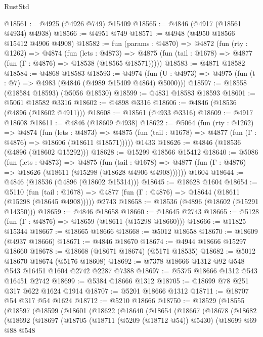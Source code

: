 \begin{lexlean}{RustStd}
\begin{coremodule}
@18561 := @4925 (@4926 @749) @15409
@18565 := @4846 (@4917 (@18561 @4934) @4938)
@18566 := @4951 @749
@18571 := @4948 (@4950 @18566 @15412 @4906 @4908)
@18582 := fun (params : @4870) =>
  @4872
    (fun (rty : @1262) =>
    @4874
      (fun (lets : @4873) =>
      @4875 (fun (tail : @1678) => @4877 (fun (Γ : @4876) => @18538 (@18565 @18571)))))
@18583 := @4871 @18582
@18584 := @4868 @18583
@18593 := @4974
    (fun (U : @4973) => @4975 (fun (t : @7) => @4983 (@4846 (@4989 @15409 @4864) @5000)))
@18597 := @18558 (@18584 @18593) (@5056 @18530)
@18599 := @4831 @18583 @18593
@18601 := @5061 @18582 @3316
@18602 := @4898 @3316
@18606 := @4846 (@18536 (@4896 (@18602 @4911)))
@18608 := @18561 (@4933 @3316)
@18609 := @4917 @18608
@18611 := @4846 (@18609 @4938)
@18622 := @5064
    (fun (rty : @1262) =>
    @4874
      (fun (lets : @4873) =>
      @4875 (fun (tail : @1678) => @4877 (fun (Γ : @4876) => @18606 (@18611 @18571)))))
    @1433
@18626 := @4846 (@18536 (@4896 (@18602 @15292)))
@18628 := @15299 @18566 @15412
@18640 := @5086
    (fun (lets : @4873) =>
    @4875
      (fun (tail : @1678) =>
      @4877 (fun (Γ : @4876) => @18626 (@18611 (@15298 (@18628 @4906 @4908))))))
    @1604
@18644 := @4846 (@18536 (@4896 (@18602 @15314)))
@18645 := @18628 @1604
@18654 := @5110
    (fun (tail : @1678) => @4877 (fun (Γ : @4876) => @18644 (@18611 (@15298 (@18645 @4908)))))
    @2743
@18658 := @18536 (@4896 (@18602 (@15291 @14350)))
@18659 := @4846 @18658
@18660 := @18645 @2743
@18665 := @5128 (fun (Γ : @4876) => @18659 (@18611 (@15298 @18660)))
@18666 := @11825 @15344
@18667 := @18665 @18666
@18668 := @5012 @18658
@18670 := @18609 (@4937 @18666)
@18671 := @4846 @18670
@18674 := @4944 @18666 @15297 @18660
@18678 := @18668 (@18671 @18674) (@5171 @18535)
@18682 := @5012 @18670 @18674 (@5176 @18608)
@18692 := @7378 @18666 @1312 @92 @548 @543 @16451 @1604 @2742 @2287 @7388
@18697 := @5375 @18666 @1312 @543 @16451 @2742
@18699 := @5384 @18666 @1312
@18705 := @18699 @78 @251 @317 @622 @1624 @1914
@18707 := @5201 @18666 @1312
@18711 := @18707 @54 @317 @54 @1624
@18712 := @5210 @18666
@18750 := @18529
    (@18555
      (@18597
        (@18599
          (@18601
            (@18622
              (@18640
                (@18654
                  (@18667
                    (@18678
                      (@18682
                        (@18692
                          (@18697
                            (@18705
                              (@18711 (@5209 (@18712 @54)) @5430)
                              (@18699
                                @69
                                @88
                                @548

\end{coremodule}
\end{lexlean}
